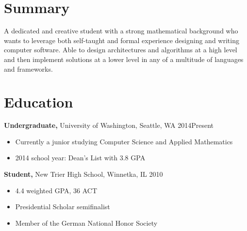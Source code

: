 \documentclass[margin]{res}
\begin{document}
\address{
  {\bf Present Address} \\ 4000 NE 15th Avenue \\ Seattle, WA 98195 \\
  {\bf Permanent Address} \\ 1310 Maple Avenue \\ Wilmette, IL 60091 }
\address{
  {\bf Contact Information} \\ dangeloandrew@outlook.com \\ +1 (847) 906-3448 \\
  {\bf GitHub Profile} \\ https://github.com/excelangue }

\begin{resume}

\section{Summary}
A dedicated and creative student with a strong mathematical background who wants to leverage both self-taught and formal experience designing and writing computer software. Able to design architectures and algorithms at a high level and then implement solutions at a lower level in any of a multitude of languages and frameworks.

\section{Education}

{\bf Undergraduate,} University of Washington, Seattle, WA \hfill 2014\textendash Present
\begin{itemize} \itemsep -2pt  %
\item Currently a junior studying Computer Science and Applied Mathematics
\item 2014 school year: Dean's List with 3.8 GPA
\end{itemize}

{\bf Student,}  New Trier High School, Winnetka, IL \hfill 2010
\begin{itemize} \itemsep -2pt  %
\item 4.4 weighted GPA, 36 ACT
\item Presidential Scholar semifinalist
\item Member of the German National Honor Society
\end{itemize}


\end{resume}
\end{document}
